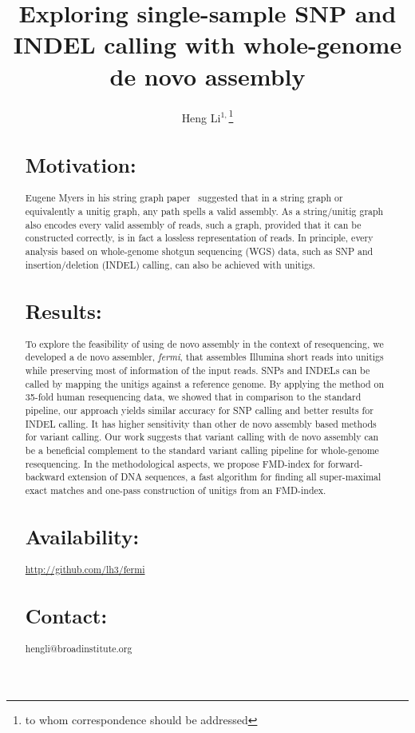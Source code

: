 \documentclass{bioinfo}
\begin{document}

\title[Variant calling from de novo assembly]{Exploring single-sample SNP and INDEL calling with whole-genome de novo assembly}

\author[Li]{Heng Li$^{1,}$\footnote{to whom correspondence should be addressed}}

\address{$^1$Broad Institute, 7 Cambridge Center, Cambridge, MA 02142, USA}

\maketitle

\begin{abstract}

\section{Motivation:}
Eugene Myers in his string graph paper~\citep{Myers:2005bh} suggested that in a
string graph or equivalently a unitig graph, any path spells a valid assembly.
As a string/unitig graph also encodes every valid assembly of reads, such a
graph, provided that it can be constructed correctly, is in fact a lossless
representation of reads. In principle, every analysis based on whole-genome
shotgun sequencing (WGS) data, such as SNP and insertion/deletion (INDEL)
calling, can also be achieved with unitigs.

\section{Results:}
To explore the feasibility of using de novo assembly in the context of
resequencing, we developed a de novo assembler, \emph{fermi}, that assembles
Illumina short reads into unitigs while preserving most of information of the
input reads. SNPs and INDELs can be called by mapping the unitigs against a
reference genome. By applying the method on 35-fold human resequencing data,
we showed that in comparison to the standard pipeline, our approach yields
similar accuracy for SNP calling and better results for INDEL calling. It has
higher sensitivity than other de novo assembly based methods for variant
calling. Our work suggests that variant calling with de novo assembly can be a
beneficial complement to the standard variant calling pipeline for whole-genome
resequencing. In the methodological aspects, we propose FMD-index for
forward-backward extension of DNA sequences, a fast algorithm for finding
all super-maximal exact matches and one-pass construction of unitigs
from an FMD-index.

\section{Availability:} \href{http://github.com/lh3/fermi}{http://github.com/lh3/fermi}
\section{Contact:} hengli@broadinstitute.org
\end{abstract}
\end{document}

